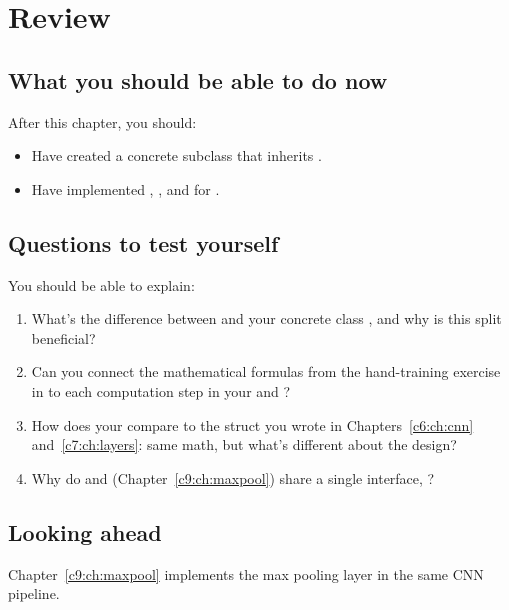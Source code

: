 
\section{Review}
\label{c8:sec:review}

\subsection*{What you should be able to do now}
After this chapter, you should:
\begin{itemize}
  \item Have created a concrete subclass  that inherits
    .
  \item Have implemented , , and  for
    .
\end{itemize}

\subsection*{Questions to test yourself}
You should be able to explain:
\begin{enumerate}
  \item What's the difference between  and your concrete class
    , and why is this split beneficial?
  \item Can you connect the mathematical formulas from the hand-training exercise in
     to each computation step in your  and
    ?
  \item How does your  compare to the  struct you
    wrote in Chapters~\ref{c6:ch:cnn} and~\ref{c7:ch:layers}: same math, but what's different about
    the design?
  \item Why do  and  (Chapter~\ref{c9:ch:maxpool}) share a single
    interface, ?
\end{enumerate}

\subsection*{Looking ahead}
Chapter~\ref{c9:ch:maxpool} implements the max pooling layer in the same CNN pipeline.
